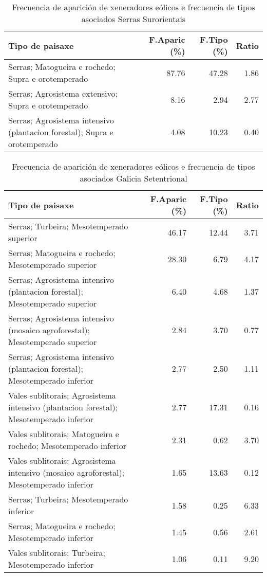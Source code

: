 \begin{table}[p]
\centering
\caption{Frecuencia de aparición de xeneradores eólicos e frecuencia de tipos asociados Serras Surorientais} 
\label{veolico9}
\begin{tabular}{lrrr}
  \hline
Tipo de paisaxe & F.Aparic (\%) & F.Tipo (\%) & Ratio \\ 
  \hline
Serras; Matogueira e rochedo; Supra e orotemperado & 87.76 & 47.28 & 1.86 \\ 
  Serras; Agrosistema extensivo; Supra e orotemperado & 8.16 & 2.94 & 2.77 \\ 
  Serras; Agrosistema intensivo (plantacion forestal); Supra e orotemperado & 4.08 & 10.23 & 0.40 \\ 
   \hline
\end{tabular}
\end{table}
\begin{table}[p]
\centering
\caption{Frecuencia de aparición de xeneradores eólicos e frecuencia de tipos asociados Galicia Setentrional} 
\label{veolico10}
\begin{tabular}{lrrr}
  \hline
Tipo de paisaxe & F.Aparic (\%) & F.Tipo (\%) & Ratio \\ 
  \hline
Serras; Turbeira; Mesotemperado superior & 46.17 & 12.44 & 3.71 \\ 
  Serras; Matogueira e rochedo; Mesotemperado superior & 28.30 & 6.79 & 4.17 \\ 
  Serras; Agrosistema intensivo (plantacion forestal); Mesotemperado superior & 6.40 & 4.68 & 1.37 \\ 
  Serras; Agrosistema intensivo (mosaico agroforestal); Mesotemperado superior & 2.84 & 3.70 & 0.77 \\ 
  Serras; Agrosistema intensivo (plantacion forestal); Mesotemperado inferior & 2.77 & 2.50 & 1.11 \\ 
  Vales sublitorais; Agrosistema intensivo (plantacion forestal); Mesotemperado inferior & 2.77 & 17.31 & 0.16 \\ 
  Vales sublitorais; Matogueira e rochedo; Mesotemperado inferior & 2.31 & 0.62 & 3.70 \\ 
  Vales sublitorais; Agrosistema intensivo (mosaico agroforestal); Mesotemperado inferior & 1.65 & 13.63 & 0.12 \\ 
  Serras; Turbeira; Mesotemperado inferior & 1.58 & 0.25 & 6.33 \\ 
  Serras; Matogueira e rochedo; Mesotemperado inferior & 1.45 & 0.56 & 2.61 \\ 
  Vales sublitorais; Turbeira; Mesotemperado inferior & 1.06 & 0.11 & 9.20 \\ 
   \hline
\end{tabular}
\end{table}
